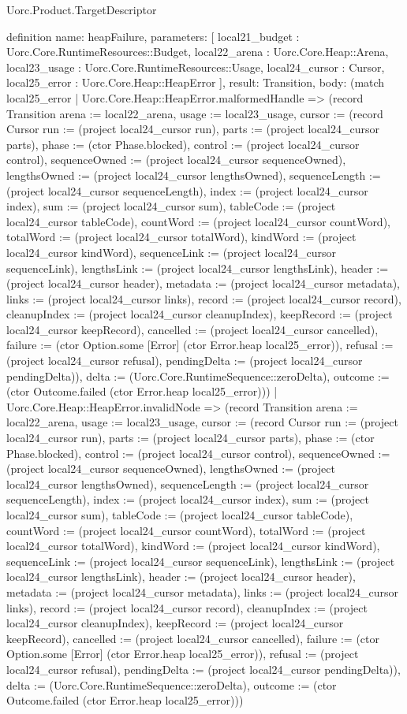 \begin{lexlean}{Uorc.Product.TargetDescriptor}
\begin{semanticmodule}
definition{
  name: heapFailure,
  parameters: [
    local21_budget : Uorc.Core.RuntimeResources::Budget,
    local22_arena : Uorc.Core.Heap::Arena,
    local23_usage : Uorc.Core.RuntimeResources::Usage,
    local24_cursor : Cursor,
    local25_error : Uorc.Core.Heap::HeapError
  ],
  result: Transition,
  body: (match local25_error
    | Uorc.Core.Heap::HeapError.malformedHandle => (record Transition {arena := local22_arena, usage := local23_usage, cursor := (record Cursor {run := (project local24_cursor run), parts := (project local24_cursor parts), phase := (ctor Phase.blocked), control := (project local24_cursor control), sequenceOwned := (project local24_cursor sequenceOwned), lengthsOwned := (project local24_cursor lengthsOwned), sequenceLength := (project local24_cursor sequenceLength), index := (project local24_cursor index), sum := (project local24_cursor sum), tableCode := (project local24_cursor tableCode), countWord := (project local24_cursor countWord), totalWord := (project local24_cursor totalWord), kindWord := (project local24_cursor kindWord), sequenceLink := (project local24_cursor sequenceLink), lengthsLink := (project local24_cursor lengthsLink), header := (project local24_cursor header), metadata := (project local24_cursor metadata), links := (project local24_cursor links), record := (project local24_cursor record), cleanupIndex := (project local24_cursor cleanupIndex), keepRecord := (project local24_cursor keepRecord), cancelled := (project local24_cursor cancelled), failure := (ctor Option.some [Error] (ctor Error.heap local25_error)), refusal := (project local24_cursor refusal), pendingDelta := (project local24_cursor pendingDelta)}), delta := (Uorc.Core.RuntimeSequence::zeroDelta), outcome := (ctor Outcome.failed (ctor Error.heap local25_error))})
    | Uorc.Core.Heap::HeapError.invalidNode => (record Transition {arena := local22_arena, usage := local23_usage, cursor := (record Cursor {run := (project local24_cursor run), parts := (project local24_cursor parts), phase := (ctor Phase.blocked), control := (project local24_cursor control), sequenceOwned := (project local24_cursor sequenceOwned), lengthsOwned := (project local24_cursor lengthsOwned), sequenceLength := (project local24_cursor sequenceLength), index := (project local24_cursor index), sum := (project local24_cursor sum), tableCode := (project local24_cursor tableCode), countWord := (project local24_cursor countWord), totalWord := (project local24_cursor totalWord), kindWord := (project local24_cursor kindWord), sequenceLink := (project local24_cursor sequenceLink), lengthsLink := (project local24_cursor lengthsLink), header := (project local24_cursor header), metadata := (project local24_cursor metadata), links := (project local24_cursor links), record := (project local24_cursor record), cleanupIndex := (project local24_cursor cleanupIndex), keepRecord := (project local24_cursor keepRecord), cancelled := (project local24_cursor cancelled), failure := (ctor Option.some [Error] (ctor Error.heap local25_error)), refusal := (project local24_cursor refusal), pendingDelta := (project local24_cursor pendingDelta)}), delta := (Uorc.Core.RuntimeSequence::zeroDelta), outcome := (ctor Outcome.failed (ctor Error.heap local25_error))})
}
\end{semanticmodule}
\end{lexlean}
